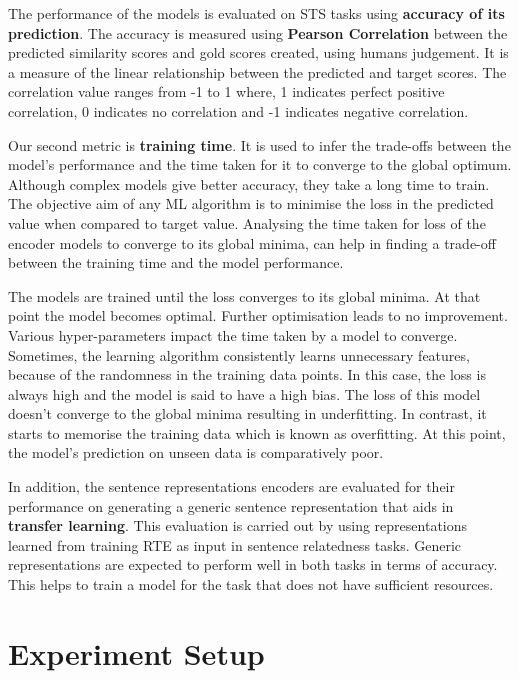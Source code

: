 \documentclass[12pt]{report} %
\begin{document}
 The performance of the models is evaluated on STS tasks using \textbf{accuracy of its prediction}. The accuracy is measured using \textbf{Pearson Correlation} between the predicted similarity scores and gold scores created, using humans judgement. 
 It is a measure of the linear relationship between the predicted and target scores. The correlation value ranges from -1 to 1 where, 1 indicates perfect positive correlation, 0 indicates no correlation and -1 indicates negative correlation.
 
 Our second metric is \textbf{training time}. It is used to infer the trade-offs between the model's performance and the time taken for it to converge to the global optimum. Although complex models give better accuracy, they take a long time to train. The objective aim of any ML algorithm is to minimise the loss in the predicted value when compared to target value. Analysing the time taken for loss of the encoder models to converge to its global minima, can help in finding a trade-off between the training time and the model performance. 
 
 The models are trained until the loss converges to its global minima. At that point the model becomes optimal. Further optimisation leads to no improvement. Various hyper-parameters impact the time taken by a model to converge. Sometimes, the learning algorithm consistently learns unnecessary features, because of the randomness in the training data points. In this case, the loss is always high and the model is said to have a high bias. The loss of this model doesn't converge to the global minima resulting in underfitting. In contrast, it starts to memorise the training data which is known as overfitting. At this point, the model's prediction on unseen data is comparatively poor.   
 
 In addition, the sentence representations encoders are evaluated for their performance on generating a generic sentence representation that aids in \textbf{transfer learning}. This evaluation is carried out by using representations learned from training RTE as input in sentence relatedness tasks. Generic representations are expected to perform well in both tasks in terms of accuracy. This helps to train a model for the task that does not have sufficient resources.  
 
 \section{Experiment Setup}
 \label{exp_setup}
 
\end{document}
